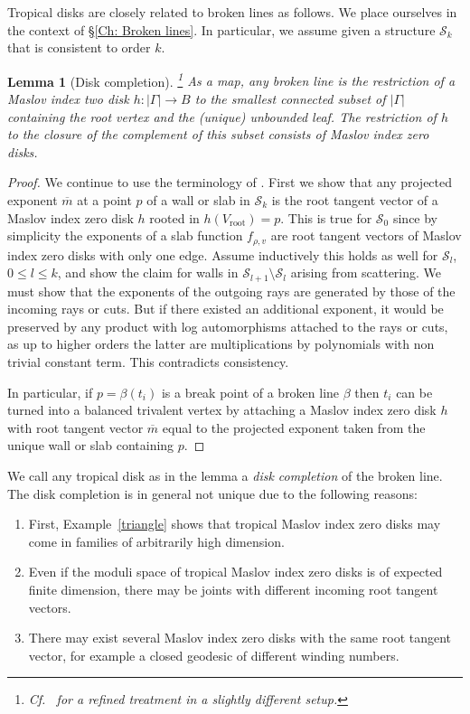 \documentclass[11pt,letter]{amsart}
\newtheorem{lemma}[theorem]{Lemma}
\theoremstyle{definition}
\theoremstyle{remark}
\numberwithin{equation}{section}
\numberwithin{figure}{section}
\newcommand {\rootvertex}  {V_{\mathrm{root}}}
\newcommand {\scrS}  {\mathscr{S}}
\begin{document}
Tropical disks are closely related to broken lines as follows. We place
ourselves in the context of \S\ref{Ch: Broken lines}. In particular, we assume
given a structure $\scrS_k$ that is consistent to order $k$.

\begin{lemma}[Disk completion]\footnote{Cf.\ \cite[Prop.4.13]{CanonicalWalls} for a refined treatment in a slightly different setup.}
\label{line-disk} 
As a map, any broken line is the restriction of a Maslov index two disk $h:
|\Gamma| \to B$ to the smallest connected subset of $|\Gamma|$ containing the
root vertex and the (unique) unbounded leaf. The restriction of $h$ to the
closure of the complement of this subset consists of Maslov index zero disks.
\end{lemma}

\begin{proof} 
We continue to use the terminology of \cite{affinecomplex}. First we show that
any projected exponent $\overline m$ at a point $p$ of a wall or slab in
$\scrS_k$ is the root tangent vector of a Maslov index zero disk $h$ rooted in
$h(\rootvertex)=p$. This is true for $\scrS_0$ since by simplicity the exponents
of a slab function $f_{\rho,v}$ are root tangent vectors of Maslov index zero
disks with only one edge. Assume inductively this holds as well for $\scrS_{l}$,
$0\le l \le k$, and show the claim for walls in $\scrS_{l+1}\setminus \scrS_{l}$
arising from scattering. We must show that the exponents of the outgoing rays
are generated by those of the incoming rays or cuts. But if there existed an
additional exponent, it would be preserved by any product with log automorphisms
attached to the rays or cuts, as up to higher orders the latter are
multiplications by polynomials with non trivial constant term. This contradicts
consistency.

In particular, if $p=\beta(t_i)$ is a break point of a broken line $\beta$ then
$t_i$ can be turned into a balanced trivalent vertex by attaching a Maslov index
zero disk $h$ with root tangent vector $\overline m$ equal to the projected
exponent taken from the unique wall or slab containing $p$.
\end{proof}

\noindent
We call any tropical disk as in the lemma a \emph{disk completion} of the broken
line. The disk completion is in general not unique due to the following reasons:
\begin{enumerate}
\item
First, Example~\ref{triangle} shows that tropical Maslov index zero disks may
come in families of arbitrarily high dimension.
\item
Even if the moduli space of tropical Maslov index zero disks is of expected
finite dimension, there may be joints with different incoming root tangent
vectors.
\item
There may exist several Maslov index zero disks with the same root
tangent vector, for example a closed geodesic of different winding numbers.
\end{enumerate}
\end{document}
